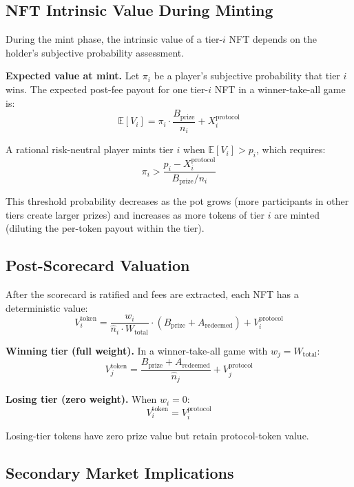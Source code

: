 \documentclass[11pt,a4paper]{article}
\begin{document}
\subsection{NFT Intrinsic Value During Minting}

During the mint phase, the intrinsic value of a tier-$i$ NFT depends on the holder's subjective probability assessment.

\textbf{Expected value at mint.} Let $\pi_i$ be a player's subjective probability that tier $i$ wins. The expected post-fee payout for one tier-$i$ NFT in a winner-take-all game is:
\begin{equation}
\mathbb{E}[V_i] = \pi_i \cdot \frac{B_{\text{prize}}}{n_i} + X_i^{\text{protocol}}
\end{equation}

A rational risk-neutral player mints tier $i$ when $\mathbb{E}[V_i] > p_i$, which requires:
\begin{equation}
\pi_i > \frac{p_i - X_i^{\text{protocol}}}{B_{\text{prize}} / n_i}
\end{equation}

This threshold probability decreases as the pot grows (more participants in other tiers create larger prizes) and increases as more tokens of tier $i$ are minted (diluting the per-token payout within the tier).

\subsection{Post-Scorecard Valuation}

After the scorecard is ratified and fees are extracted, each NFT has a deterministic value:
\begin{equation}
V_i^{\text{token}} = \frac{w_i}{\hat{n}_i \cdot W_{\text{total}}} \cdot (B_{\text{prize}} + A_{\text{redeemed}}) + V_i^{\text{protocol}}
\end{equation}

\textbf{Winning tier (full weight).} In a winner-take-all game with $w_j = W_{\text{total}}$:
$$V_j^{\text{token}} = \frac{B_{\text{prize}} + A_{\text{redeemed}}}{\hat{n}_j} + V_j^{\text{protocol}}$$

\textbf{Losing tier (zero weight).} When $w_i = 0$:
$$V_i^{\text{token}} = V_i^{\text{protocol}}$$

Losing-tier tokens have zero prize value but retain protocol-token value.

\subsection{Secondary Market Implications}
\end{document}
